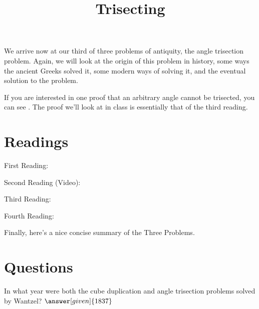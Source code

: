 \documentclass{ximera}
\title{Trisecting}
\begin{document}
\begin{abstract}
\end{abstract}
\maketitle

We arrive now at our third of three problems of antiquity, the angle trisection 
problem.  Again, we will look at the origin of this problem in history, some ways 
the ancient Greeks solved it, some modern ways of solving it, and the eventual 
solution to the problem.

If you are interested in one proof that an arbitrary angle cannot be trisected, 
you can see .  
The proof we'll look at in class is essentially that of the third reading.


\section{Readings}

First Reading: 

Second Reading (Video): 

Third Reading: 

Fourth Reading: 

Finally, here's a nice concise summary of the Three Problems. 



\section{Questions}

\begin{question}
In what year were both the cube duplication and angle trisection problems solved by Wantzel? $\answer[given]{1837}$
\end{question}
\end{document}
